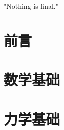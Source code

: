 \documentclass[12pt,a4paper]{book}
\newcommand{\notebody}{
	\chapter*{前言}
	
	\chapter{数学基础}
	
	\chapter{力学基础}
	



}
\begin{document}
	\frontmatter
	

	\newpage

	\thispagestyle{empty}
	\vspace*{\fill}
	\begin{center}
		{\kaishu\fontsize{18}{28}\selectfont "Nothing is final."}
	\end{center}
	\vfill
	\newpage

	\setcounter{tocdepth}{3}

	\tableofcontents

	\mainmatter
	\markboth{}{}	\notebody
\end{document}
